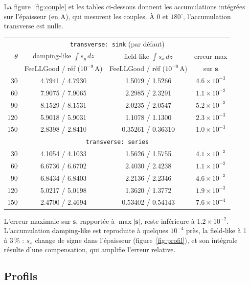 \documentclass[11pt,a4paper]{article}
\newcommand{\vs}{\bm{s}}
\begin{document}
La figure~\ref{fig:couple} et les tables ci-dessous donnent les
accumulations intégrées sur l'épaisseur (en A), qui mesurent les couples.
À 0 et $180^\circ$, l'accumulation transverse est nulle.

\begin{center}
\small
\renewcommand{\arraystretch}{1.15}
\begin{tabular}{rccc}
  \toprule
  \multicolumn{4}{c}{\texttt{transverse: sink} (par défaut)} \\
  $\theta$ & damping-like $\int s_y\,dz$ & field-like $\int s_x\,dz$ & erreur max \\
  & FeeLLGood / réf ($10^{-9}$\,A) & FeeLLGood / réf ($10^{-9}$\,A) & sur $\vs$ \\
  \midrule
  30  & 4.7941 / 4.7930 & 1.5079 / 1.5266 & $4.6\times10^{-3}$ \\
  60  & 7.9075 / 7.9065 & 2.2985 / 2.3291 & $1.1\times10^{-2}$ \\
  90  & 8.1529 / 8.1531 & 2.0235 / 2.0547 & $5.2\times10^{-3}$ \\
  120 & 5.9018 / 5.9031 & 1.1078 / 1.1300 & $2.3\times10^{-3}$ \\
  150 & 2.8398 / 2.8410 & 0.35261 / 0.36310 & $1.0\times10^{-3}$ \\
  \midrule
  \multicolumn{4}{c}{\texttt{transverse: series}} \\
  \midrule
  30  & 4.1054 / 4.1033 & 1.5626 / 1.5755 & $4.1\times10^{-3}$ \\
  60  & 6.6736 / 6.6702 & 2.4030 / 2.4238 & $1.1\times10^{-2}$ \\
  90  & 6.8434 / 6.8403 & 2.2136 / 2.2346 & $4.6\times10^{-3}$ \\
  120 & 5.0217 / 5.0198 & 1.3620 / 1.3772 & $1.9\times10^{-3}$ \\
  150 & 2.4700 / 2.4694 & 0.53402 / 0.54143 & $7.6\times10^{-4}$ \\
  \bottomrule
\end{tabular}
\end{center}
L'erreur maximale sur $\vs$, rapportée à $\max|\vs|$, reste inférieure à
$1.2\times10^{-2}$. L'accumulation damping-like est reproduite à quelques
$10^{-4}$ près, la field-like à 1 à 3\,\% : $s_x$ change de signe dans
l'épaisseur (figure~\ref{fig:profil}), et son intégrale résulte d'une
compensation, qui amplifie l'erreur relative.

\subsection{Profils}
\end{document}
